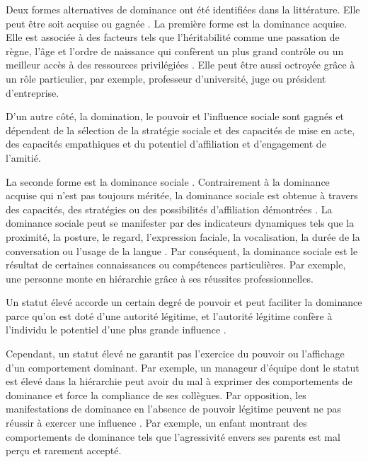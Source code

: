 		Deux formes alternatives de dominance ont été identifiées dans la littérature. Elle peut être soit acquise ou gagnée \cite{liska1990dominance}.
		La première forme est la dominance acquise. Elle est associée à des facteurs tels que l'héritabilité comme une passation de règne, l'âge et l'ordre de naissance qui confèrent un plus grand contrôle ou un meilleur accès à des ressources privilégiées \cite{cattell1970handbook}. Elle peut être aussi octroyée grâce à un rôle particulier, par exemple, professeur d'université, juge ou président d'entreprise.
		
	
	 	D'un autre côté, la domination, le pouvoir et l'influence sociale sont gagnés et dépendent de la sélection de la stratégie sociale et des capacités de mise en acte, des capacités empathiques et du potentiel d'affiliation et d'engagement de l'amitié.
		
		La seconde forme est la dominance sociale \cite{liska1990dominance}. Contrairement à la dominance acquise qui n'est pas toujours méritée, la dominance sociale est obtenue à travers des capacités, des stratégies ou des possibilités d'affiliation démontrées \cite{burgoon1998nature}.  La dominance sociale peut se manifester par des indicateurs dynamiques tels que la proximité, la posture, le regard, l'expression faciale, la vocalisation, la durée de la conversation ou l'usage de la langue \cite{keating1985human}. Par conséquent, la dominance sociale est le résultat de certaines connaissances ou compétences particulières. Par exemple, une personne monte en hiérarchie grâce à ses réussites professionnelles.
			
		Un statut élevé accorde un certain degré de pouvoir et peut faciliter la dominance parce qu'on est doté d'une autorité légitime, et l'autorité légitime confère à l'individu le potentiel d'une plus grande influence \cite{burgoon2006nonverbal}. 
		
		Cependant, un statut élevé ne garantit pas l'exercice du pouvoir ou l'affichage d'un comportement dominant. Par exemple, un manageur d'équipe dont le statut est élevé dans la hiérarchie peut avoir du mal à exprimer des comportements de dominance et force la compliance de ses collègues. Par opposition, les manifestations de dominance en l'absence de pouvoir légitime peuvent ne pas réussir à exercer une influence \cite{ridgeway1995legitimacy}. Par exemple, un enfant montrant des comportements de dominance tels que l'agressivité envers ses parents est mal perçu et rarement accepté.
		
